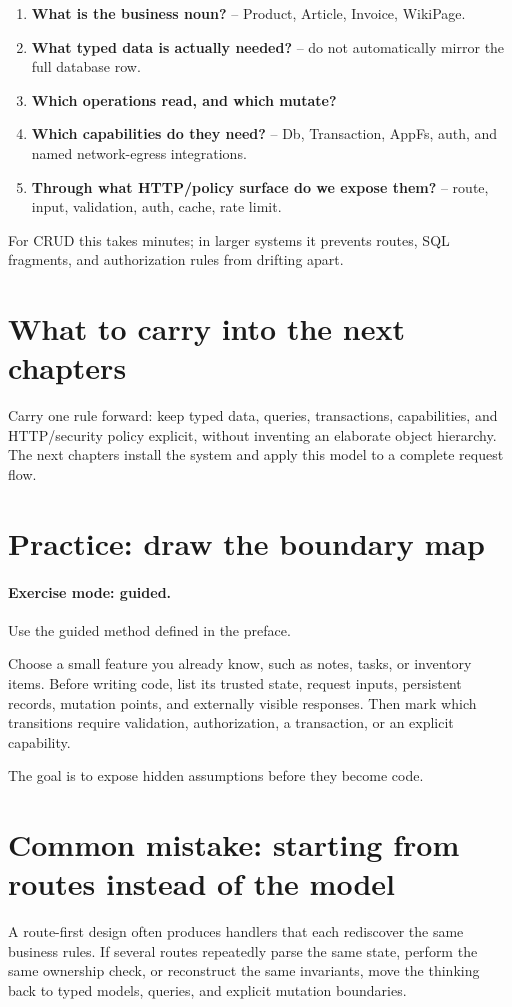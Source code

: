 \begin{enumerate}
  \item \textbf{What is the business noun?} -- Product, Article, Invoice, WikiPage.
  \item \textbf{What typed data is actually needed?} -- do not automatically mirror the full database row.
  \item \textbf{Which operations read, and which mutate?}
  \item \textbf{Which capabilities do they need?} -- Db, Transaction, AppFs, auth, and named network-egress integrations.
  \item \textbf{Through what HTTP/policy surface do we expose them?} -- route, input, validation, auth, cache, rate limit.
\end{enumerate}

For CRUD this takes minutes; in larger systems it prevents routes, SQL fragments, and authorization rules from drifting apart.

\section{What to carry into the next chapters}

Carry one rule forward: keep typed data, queries, transactions, capabilities, and HTTP/security policy explicit, without inventing an elaborate object hierarchy. The next chapters install the system and apply this model to a complete  request flow.

\section{Practice: draw the boundary map}
\paragraph{Exercise mode: guided.} Use the guided method defined in the preface.

Choose a small feature you already know, such as notes, tasks, or inventory items. Before writing code, list its trusted state, request inputs, persistent records, mutation points, and externally visible responses. Then mark which transitions require validation, authorization, a transaction, or an explicit capability.

The goal is to expose hidden assumptions before they become code.

\section{Common mistake: starting from routes instead of the model}
A route-first design often produces handlers that each rediscover the same business rules. If several routes repeatedly parse the same state, perform the same ownership check, or reconstruct the same invariants, move the thinking back to typed models, queries, and explicit mutation boundaries.


